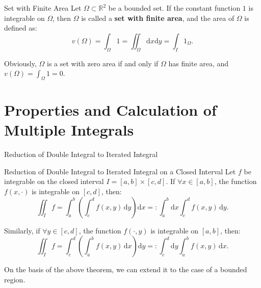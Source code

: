 \documentclass[11pt]{../../TexTemplate/elegantbook}
\begin{document}
\begin{definition}{Set with Finite Area}
    Let \( \Omega \subset \mathbb{R}^2 \) be a bounded set. 
    If the constant function \( 1 \) is integrable on \( \Omega \), 
    then \( \Omega \) is called a \textbf{set with finite area}, and the area of \( \Omega \) is defined as:
    \[
    v(\Omega) = \int_\Omega 1 = \iint_\Omega \mathrm{d}x \mathrm{d}y = \int_I 1_\Omega.
    \]

\end{definition}

Obviously, \(\Omega\) is a set with zero area if and only if \(\Omega\) has finite area, 
and \(v(\Omega) = \int_\Omega 1 = 0\).


\section{Properties and Calculation of Multiple Integrals}

\begin{leftbarTitle}{Reduction of Double Integral to Iterated Integral}\end{leftbarTitle}

\begin{theorem}{Reduction of Double Integral to Iterated Integral on a Closed Interval}\label{thm:Reduction of Double Integral to Iterated Integral on a Closed Interval}
    Let \( f \) be integrable on the closed interval \( I = [a, b] \times [c, d] \). 
    If \( \forall x \in [a, b] \), the function \( f(x, \cdot) \) is integrable on \( [c, d] \), then:
    \[
    \iint_I f = \int_a^b \left( \int_c^d f(x, y) \, \mathrm{d}y \right) \mathrm{d}x
    =: \int_{a}^{b}\mathrm{d}x\int_{c}^{d}f(x,y)\,\mathrm{d}y.
    \]

    Similarly, if \( \forall y \in [c, d] \), the function \( f(\cdot, y) \) is integrable on \( [a, b] \), then:
    \[
    \iint_I f = \int_c^d \left( \int_a^b f(x, y) \, \mathrm{d}x \right) \mathrm{d}y
    =: \int_{c}^{d}\mathrm{d}y\int_{a}^{b}f(x,y)\,\mathrm{d}x.
    \]
\end{theorem}

On the basis of the above theorem, we can extend it to the case of a bounded region.
\end{document}
